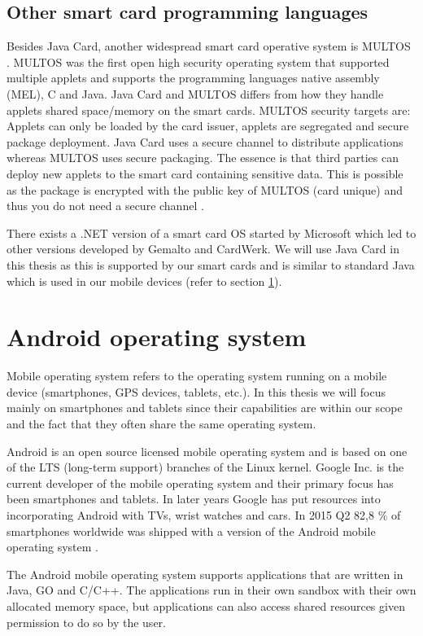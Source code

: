 \subsection{Other smart card programming languages}
Besides Java Card, another widespread smart card operative system is MULTOS \cite{multos}. MULTOS was the first open high security operating system that supported multiple applets and supports the programming languages native assembly (MEL), C and Java. Java Card and MULTOS differs from how they handle applets shared space/memory on the smart cards. MULTOS security targets are: Applets can only be loaded by the card issuer, applets are segregated and secure package deployment. Java Card uses a secure channel to distribute applications whereas MULTOS uses secure packaging. The essence is that third parties can deploy new applets to the smart card containing sensitive data. This is possible as the package is encrypted with the public key of MULTOS (card unique) and thus you do not need a secure channel \cite{smartcardThesis, hmultosVSjavacard}.

There exists a .NET version of a smart card OS started by Microsoft which led to other versions developed by Gemalto and CardWerk. We will use Java Card in this thesis as this is supported by our smart cards and is similar to standard Java which is used in our mobile devices (refer to section \ref{sec:androidOS}).

\section{Android operating system}
\label{sec:androidOS}
Mobile operating system refers to the operating system running on a mobile device (smartphones, GPS devices, tablets, etc.). In this thesis we will focus mainly on smartphones and tablets since their capabilities are within our scope and the fact that they often share the same operating system.

Android is an open source licensed mobile operating system and is based on one of the LTS (long-term support) branches of the Linux kernel. Google Inc. \cite{google} is the current developer of the mobile operating system and their primary focus has been smartphones and tablets. In later years Google has put resources into incorporating Android with TVs, wrist watches and cars. In 2015 Q2 82,8 \% of smartphones worldwide was shipped with a version of the Android mobile operating system \cite{androidMarketShare}.

The Android mobile operating system supports applications that are written in Java, GO and C/C++. The applications run in their own sandbox with their own allocated memory space, but applications can also access shared resources given permission to do so by the user.

